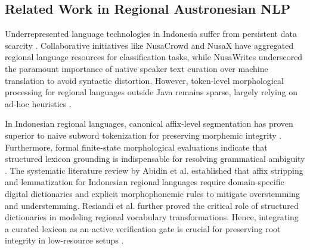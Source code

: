 \documentclass[journal,10pt]{IEEEtran}
\begin{document}
\subsection{Related Work in Regional Austronesian NLP}
Underrepresented language technologies in Indonesia suffer from persistent data scarcity \cite{aji2022, ranathunga2023, winata2023}. Collaborative initiatives like NusaCrowd \cite{winata2023} and NusaX \cite{cahyawijaya2023} have aggregated regional language resources for classification tasks, while NusaWrites \cite{cahyawijaya2023nusawrites} underscored the paramount importance of native speaker text curation over machine translation to avoid syntactic distortion. However, token-level morphological processing for regional languages outside Java remains sparse, largely relying on ad-hoc heuristics \cite{abidin2024}.

In Indonesian regional languages, canonical affix-level segmentation has proven superior to naive subword tokenization for preserving morphemic integrity \cite{wijono2021}. Furthermore, formal finite-state morphological evaluations indicate that structured lexicon grounding is indispensable for resolving grammatical ambiguity \cite{prihantoro2021}. The systematic literature review by Abidin et al. \cite{abidin2024} established that affix stripping and lemmatization for Indonesian regional languages require domain-specific digital dictionaries and explicit morphophonemic rules to mitigate overstemming and understemming. Resiandi et al. \cite{resiandi2023} further proved the critical role of structured dictionaries in modeling regional vocabulary transformations. Hence, integrating a curated lexicon as an active verification gate is crucial for preserving root integrity in low-resource setups \cite{abidin2024, jurafsky2024}.
\end{document}
